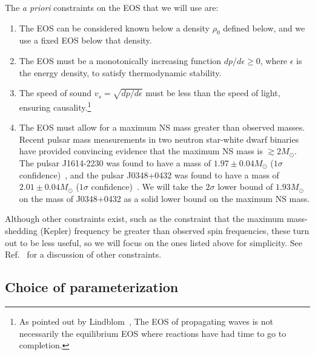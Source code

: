 \documentclass[twocolumn,prd,amssymb,aps,nofootinbib,showpacs,epsf]{revtex4}
\begin{document}
The {\it a priori} constraints on the EOS that we will use are:
\begin{enumerate}
\item The EOS can be considered known below a density $\rho_0$ defined below, and we use a fixed EOS below that density.
\item The EOS must be a monotonically increasing function $dp/d\epsilon \ge 0$, where $\epsilon$ is the energy density, to satisfy thermodynamic stability.
\item The speed of sound $v_s = \sqrt{dp/d\epsilon}$ must be less than the speed of light, ensuring causality.\footnote{As pointed out by Lindblom~\cite{Lindblom2010}, The EOS of propagating waves is not necessarily the equilibrium EOS where reactions have had time to go to completion.} 
\item The EOS must allow for a maximum NS mass greater than observed masses. Recent pulsar mass measurements in two neutron star-white dwarf binaries have provided convincing evidence that the maximum NS mass is $\gtrsim 2M_\odot$. The pulsar J1614-2230 was found to have a mass of $1.97\pm0.04M_\odot$ ($1\sigma$ confidence)~\cite{DemorestPennucciRansom2010}, and the pulsar J0348+0432 was found to have a mass of $2.01\pm0.04M_\odot$ ($1\sigma$ confidence)~\cite{AntoniadisFreireWex2013}. We will take the $2\sigma$ lower bound of $1.93M_\odot$ on the mass of J0348+0432 as a solid lower bound on the maximum NS mass.
\end{enumerate}

Although other constraints exist, such as the constraint that the maximum mass-shedding (Kepler) frequency be greater than observed spin frequencies, these turn out to be less useful, so we will focus on the ones listed above for simplicity. See Ref.~\cite{ReadLackey2009} for a discussion of other constraints.

\subsection{Choice of parameterization}
\label{sec:eosparam}
\end{document}
